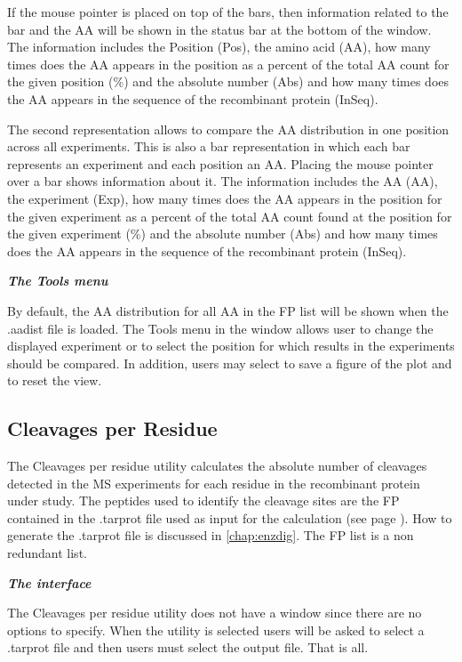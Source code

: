If the mouse pointer is placed on top of the bars, then information related to the bar and the AA will be shown in the status bar at the bottom of the window. The information includes the Position (Pos), the amino acid (AA), how many times does the AA appears in the position as a percent of the total AA count for the given position (\%) and the absolute number (Abs) and how many times does the AA appears in the sequence of the recombinant protein (InSeq).

The second representation allows to compare the AA distribution in one position across all experiments. This is also a bar representation in which each bar represents an experiment and each position an AA. Placing the mouse pointer over a bar shows information about it. The information includes the AA (AA), the experiment (Exp), how many times does the AA appears in the position for the given experiment as a percent of the total AA count found at the position for the given experiment (\%) and  the absolute number (Abs) and how many times does the AA appears in the sequence of the recombinant protein (InSeq).

\textit{\textbf{The Tools menu}}

By default, the AA distribution for all AA in the FP list will be shown when the .aadist file is loaded. The Tools menu in the window allows user to change the displayed experiment or to select the position for which results in the experiments should be compared. In addition, users may select to save a figure of the plot and to reset the view. 

\subsection{Cleavages per Residue}
\label{subsec:cutsperres}
The Cleavages per residue utility calculates the absolute number of cleavages detected in the MS experiments for each residue in the recombinant protein under study. The peptides used to identify the cleavage sites are the FP contained in the .tarprot file used as input for the calculation (see page \pageref{par:PIP}). How to generate the .tarprot file is discussed in \autoref{chap:enzdig}. The FP list is a non redundant list.

\textit{\textbf{The interface}}

The Cleavages per residue utility does not have a window since there are no options to specify. When the utility is selected users will be asked to select a .tarprot file and then users must select the output file. That is all.


